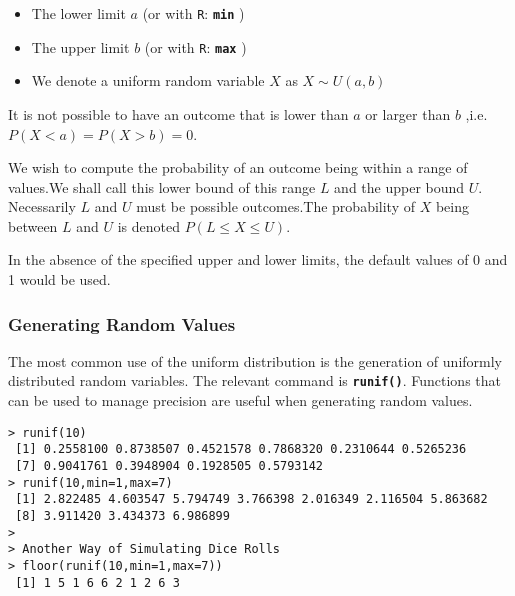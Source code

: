 \begin{itemize}
\item The lower limit $a$ (or with \texttt{R}: \texttt{\textbf{min}} )
\item The upper limit $b$ (or with \texttt{R}: \texttt{\textbf{max}} )
\item We denote a uniform random variable $X$ as $X \sim U(a,b)$
\end{itemize}

It is not possible to have an outcome that is lower than $a$ or larger than $b$ ,i.e. $ P(X < a) = P(X > b) = 0$.

We wish to compute the probability of an outcome being within a range of values.We shall call this lower bound of this range $L$ and the upper bound $ U$. Necessarily $L$ and $U$ must be possible outcomes.The probability of $X$ being between $L$ and $U$ is denoted $P( L \leq X \leq U )$.

In the absence of the specified upper and lower limits, the default values of 0 and 1 would be used.

\subsubsection{Generating Random Values}
The most common use of the uniform distribution is the generation of uniformly distributed random variables. The relevant command is \texttt{\textbf{runif()}}. Functions that can be used to manage precision are useful when generating random values.

\begin{verbatim}
> runif(10)
 [1] 0.2558100 0.8738507 0.4521578 0.7868320 0.2310644 0.5265236
 [7] 0.9041761 0.3948904 0.1928505 0.5793142
> runif(10,min=1,max=7)
 [1] 2.822485 4.603547 5.794749 3.766398 2.016349 2.116504 5.863682
 [8] 3.911420 3.434373 6.986899
>
> Another Way of Simulating Dice Rolls
> floor(runif(10,min=1,max=7))
 [1] 1 5 1 6 6 2 1 2 6 3
\end{verbatim}






